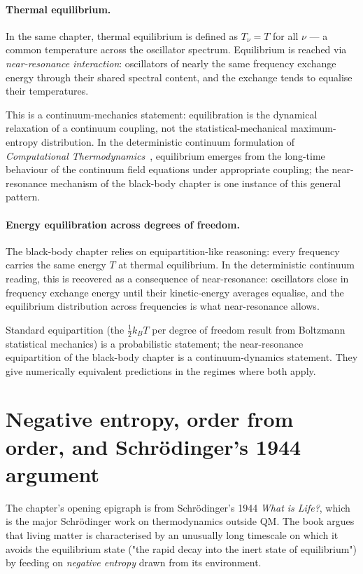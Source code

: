 \paragraph{Thermal equilibrium.}
In the same chapter, thermal equilibrium is defined as $T_\nu = T$ for all $\nu$ --- a common temperature across the oscillator spectrum. Equilibrium is reached via \emph{near-resonance interaction}: oscillators of nearly the same frequency exchange energy through their shared spectral content, and the exchange tends to equalise their temperatures.

This is a continuum-mechanics statement: equilibration is the dynamical relaxation of a continuum coupling, not the statistical-mechanical maximum-entropy distribution. In the deterministic continuum formulation of \emph{Computational Thermodynamics}~\cite{BodyAndSoulV}, equilibrium emerges from the long-time behaviour of the continuum field equations under appropriate coupling; the near-resonance mechanism of the black-body chapter is one instance of this general pattern.

\paragraph{Energy equilibration across degrees of freedom.}
The black-body chapter relies on equipartition-like reasoning: every frequency carries the same energy $T$ at thermal equilibrium. In the deterministic continuum reading, this is recovered as a consequence of near-resonance: oscillators close in frequency exchange energy until their kinetic-energy averages equalise, and the equilibrium distribution across frequencies is what near-resonance allows.

Standard equipartition (the $\tfrac{1}{2} k_B T$ per degree of freedom result from Boltzmann statistical mechanics) is a probabilistic statement; the near-resonance equipartition of the black-body chapter is a continuum-dynamics statement. They give numerically equivalent predictions in the regimes where both apply.

\section{Negative entropy, order from order, and Schr\"odinger's 1944 argument}\label{sec:negentropy}

The chapter's opening epigraph is from Schr\"odinger's 1944 \emph{What is Life?}, which is the major Schr\"odinger work on thermodynamics outside QM. The book argues that living matter is characterised by an unusually long timescale on which it avoids the equilibrium state ("the rapid decay into the inert state of equilibrium") by feeding on \emph{negative entropy} drawn from its environment.

